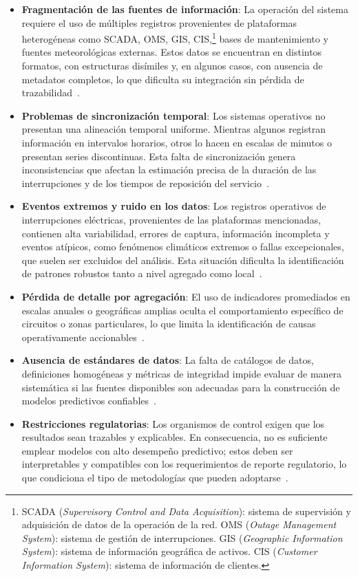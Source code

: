 \begin{itemize}
    \item \textbf{Fragmentación de las fuentes de información}: La operación del sistema requiere el uso de múltiples registros provenientes de plataformas heterogéneas como SCADA, OMS, GIS, CIS,\footnote{SCADA (\textit{Supervisory Control and Data Acquisition}): sistema de supervisión y adquisición de datos de la operación de la red. OMS (\textit{Outage Management System}): sistema de gestión de interrupciones. GIS (\textit{Geographic Information System}): sistema de información geográfica de activos. CIS (\textit{Customer Information System}): sistema de información de clientes.} bases de mantenimiento y fuentes meteorológicas externas. Estos datos se encuentran en distintos formatos, con estructuras disímiles y, en algunos casos, con ausencia de metadatos completos, lo que dificulta su integración sin pérdida de trazabilidad~\cite{ref6,ref7}.

    \item \textbf{Problemas de sincronización temporal}: Los sistemas operativos no presentan una alineación temporal uniforme. Mientras algunos registran información en intervalos horarios, otros lo hacen en escalas de minutos o presentan series discontinuas. Esta falta de sincronización genera inconsistencias que afectan la estimación precisa de la duración de las interrupciones y de los tiempos de reposición del servicio~\cite{ref7}.
    \item \textbf{Eventos extremos y ruido en los datos}: Los registros operativos de interrupciones eléctricas, provenientes de las plataformas mencionadas, contienen alta variabilidad, errores de captura, información incompleta y eventos atípicos, como fenómenos climáticos extremos o fallas excepcionales, que suelen ser excluidos del análisis. Esta situación dificulta la identificación de patrones robustos tanto a nivel agregado como local~\cite{ref1,ref8}.

    
    \item \textbf{Pérdida de detalle por agregación}: El uso de indicadores promediados en escalas anuales o geográficas amplias oculta el comportamiento específico de circuitos o zonas particulares, lo que limita la identificación de causas operativamente accionables~\cite{ref4,ref7}.
    \item \textbf{Ausencia de estándares de datos}: La falta de catálogos de datos, definiciones homogéneas y métricas de integridad impide evaluar de manera sistemática si las fuentes disponibles son adecuadas para la construcción de modelos predictivos confiables~\cite{ref6,ref7}.
    \item \textbf{Restricciones regulatorias}: Los organismos de control exigen que los resultados sean trazables y explicables. En consecuencia, no es suficiente emplear modelos con alto desempeño predictivo; estos deben ser interpretables y compatibles con los requerimientos de reporte regulatorio, lo que condiciona el tipo de metodologías que pueden adoptarse~\cite{ref3,ref4}.
\end{itemize}

